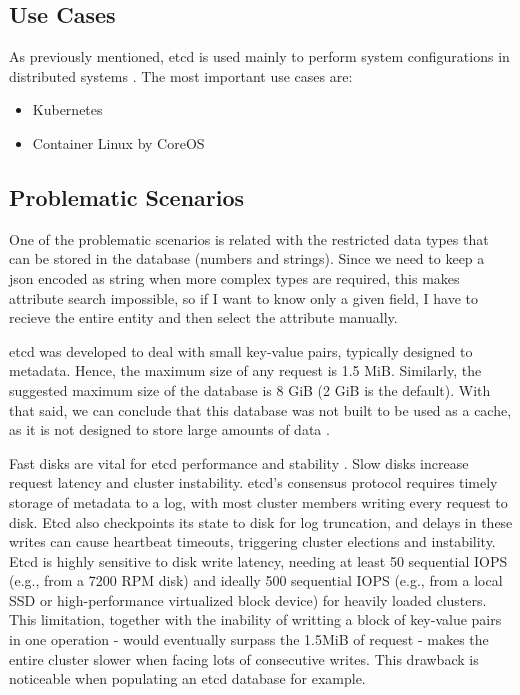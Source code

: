 \documentclass[screen,review]{acmart}
\begin{document}
\subsection{Use Cases}
As previously mentioned, etcd is used mainly to perform system configurations in distributed systems \cite{etcd_why}.
The most important use cases are:

\begin{itemize}
    \item Kubernetes
    \item Container Linux by CoreOS
\end{itemize}

\subsection{Problematic Scenarios}

One of the problematic scenarios is related with the restricted data types that can be stored in the database (numbers and strings). Since we need to keep a json encoded as string when more complex types are required, this makes attribute search impossible, so if I want to know only a given field, I have to recieve the entire entity and then select the attribute manually.

etcd was developed to deal with small key-value pairs, typically designed to metadata. Hence, the maximum size of any request is 1.5 MiB. Similarly, the suggested maximum size of the database is 8 GiB (2 GiB is the default). With that said, we can conclude that this database was not built to be used as a cache, as it is not designed to store large amounts of data \cite{etcd_sys_limits}.

Fast disks are vital for etcd performance and stability \cite{etcd_hw}. Slow disks increase request latency and cluster instability. etcd's consensus protocol requires timely storage of metadata to a log, with most cluster members writing every request to disk. Etcd also checkpoints its state to disk for log truncation, and delays in these writes can cause heartbeat timeouts, triggering cluster elections and instability. Etcd is highly sensitive to disk write latency, needing at least 50 sequential IOPS (e.g., from a 7200 RPM disk) and ideally 500 sequential IOPS (e.g., from a local SSD or high-performance virtualized block device) for heavily loaded clusters. This limitation, together with the inability of writting a block of key-value pairs in one operation - would eventually surpass the 1.5MiB of request - makes the entire cluster slower when facing lots of consecutive writes. This drawback is noticeable when populating an etcd database for example.
\end{document}

